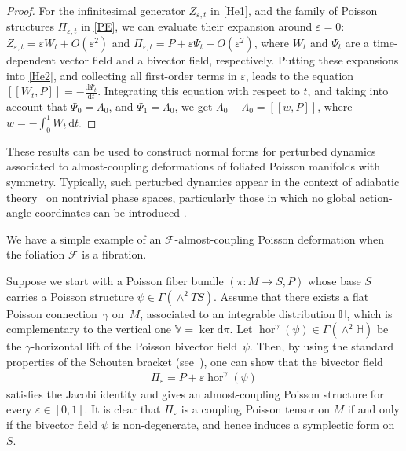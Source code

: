 \documentclass[pdftex]{sigma}
\numberwithin{equation}{section}
\begin{document}
\begin{proof}
For the inf\/initesimal generator $Z_{\varepsilon,t}$ in \eqref{He1}, and the family of Poisson structures $\Pi_{\varepsilon,t}$ in \eqref{PE}, we can evaluate their expansion around $\varepsilon =0$: $Z_{\varepsilon,t}=\varepsilon W_{t}+O(\varepsilon^{2})$ and $\Pi_{\varepsilon,t}=P+\varepsilon\Psi _{t}+O(\varepsilon^{2})$, where $W_{t}$ and $\Psi_{t}$ are a time-dependent vector f\/ield and a bivector f\/ield, respectively. Putting these expansions into \eqref{He2}, and collecting all f\/irst-order terms in $\varepsilon$, leads to the equation $[\![W_{t},P]\!]=-\frac{\mathrm{d}\Psi_{t}}{\mathrm{d}t}$. Integrating this equation with respect to $t$, and taking into account that $\Psi_{0}=\Lambda_{0}$, and $\Psi_{1}=\overline{\Lambda}_{0}$, we get $\overline{\Lambda}_{0}-\Lambda_{0}=[\![w,P]\!]$, where $w=-\int_{0}^{1}W_{t}\,\mathrm{d}t$.
\end{proof}
\begin{Remark}\label{lastrem}
These results can be used to construct normal forms for perturbed dynamics associated to almost-coupling deformations of foliated Poisson
manifolds with symmetry. Typically, such perturbed dynamics appear in the context of adiabatic theory~\cite{ArKN-88} on nontrivial phase
spaces, particularly those in which no global action-angle coordinates can be introduced \cite{MJYu-13,MJYu-13a,MYU-16}.
\end{Remark}
We have a simple example of an $\mathcal{F}$-almost-coupling Poisson deformation when the foliation $\mathcal{F}$ is a f\/ibration.
\begin{Example}\label{examp51}
Suppose we start with a Poisson f\/iber bundle $(\pi\colon M\rightarrow S,P)$ whose base $S$ carries a Poisson structure $\psi\in\Gamma(\wedge^{2}TS)$. Assume that there exists a f\/lat Poisson connection~$\gamma$ on~$M$, associated to an integrable distribution $\mathbb{H}$, which is complementary to the vertical one $\mathbb{V}=\ker \mathrm{d}\pi$. Let $\operatorname{hor}^{\gamma}(\psi)\in \Gamma(\wedge^{2}\mathbb{H})$ be the $\gamma$-horizontal lift of the Poisson bivector f\/ield~$\psi$. Then, by using the standard properties of the Schouten bracket (see~\cite{Va-94}), one can show that the bivector f\/ield
\begin{gather}\label{FC}
\Pi_{\varepsilon}=P+\varepsilon\operatorname{hor}^{\gamma}(\psi)
\end{gather}
satisf\/ies the Jacobi identity and gives an almost-coupling Poisson structure for every $\varepsilon\in [0,1]$. It is clear that $\Pi_{\varepsilon}$ is a coupling Poisson tensor on $M$ if and only if the bivector f\/ield $\psi$ is non-degenerate, and hence induces a symplectic form on $S$.
\end{Example}
\end{document}
